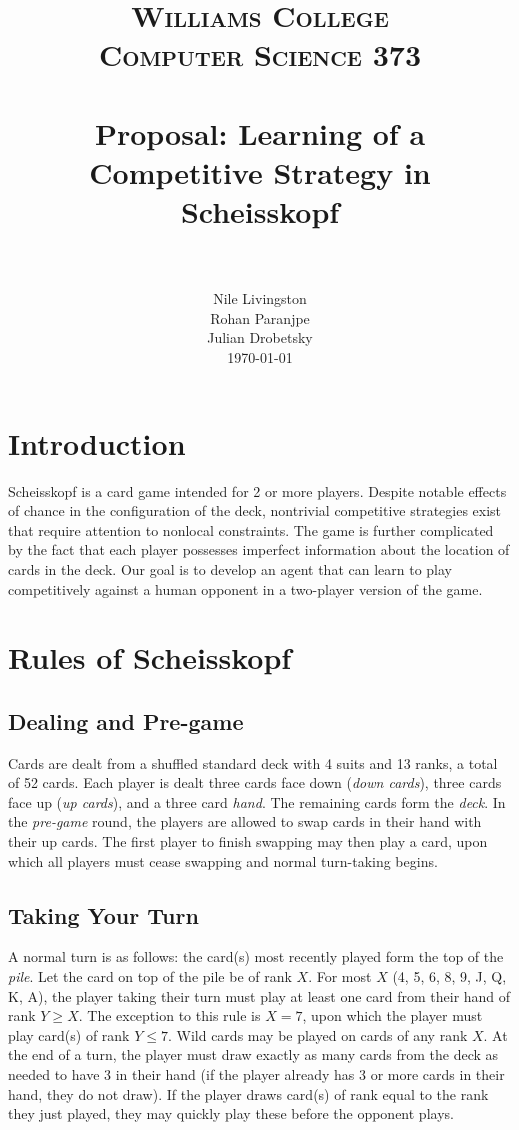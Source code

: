 \documentclass[paper=a4, fontsize=11pt]{scrartcl}
\title{
		\usefont{OT1}{bch}{b}{n}
		\normalfont \normalsize \textsc{Williams College \\ Computer Science 373} \\ [25pt]
		\horrule{0.5pt} \\[0.4cm]
		\huge Proposal: Learning of a Competitive Strategy in Scheisskopf \\
		\horrule{2pt} \\[0.5cm]
}
\author{
\normalfont 								
\normalsize Nile Livingston \\ 
\normalsize Rohan Paranjpe \\ 
\normalsize Julian Drobetsky \\
\normalsize
\today
}
\date{}
\numberwithin{equation}{section}		%
\numberwithin{figure}{section}			%
\numberwithin{table}{section}				%
\begin{document}
\maketitle
\section{Introduction}
Scheisskopf is a card game intended for 2 or more players. Despite notable effects of chance in the configuration of the deck, nontrivial competitive strategies exist that require attention to nonlocal constraints. The game is further complicated by the fact that each player possesses imperfect information about the location of cards in the deck. Our goal is to develop an agent that can learn to play competitively against a human opponent in a two-player version of the game.

\section{Rules of Scheisskopf}

\subsection{Dealing and Pre-game}
Cards are dealt from a shuffled standard deck with 4 suits and 13 ranks, a total of 52 cards. Each player is dealt three cards face down (\emph{down cards}), three cards face up (\emph{up cards}), and a three card \emph{hand}. The remaining cards form the \emph{deck}. In the \emph{pre-game} round, the players are allowed to swap cards in their hand with their up cards. The first player to finish swapping may then play a card, upon which all players must cease swapping and normal turn-taking begins. 
	
\subsection{Taking Your Turn}
A normal turn is as follows: the card(s) most recently played form the top of the \emph{pile}. Let the card on top of the pile be of rank $X$. For most $X$ (4, 5, 6, 8, 9, J, Q, K, A), the player taking their turn must play at least one card from their hand of rank $Y \geq X$. The exception to this rule is $X=7$, upon which the player must play card(s) of rank $Y \leq 7$. Wild cards may be played on cards of any rank $X$. At the end of a turn, the player must draw exactly as many cards from the deck as needed to have 3 in their hand (if the player already has 3 or more cards in their hand, they do not draw). If the player draws card(s) of rank equal to the rank they just played, they may quickly play these before the opponent plays.
\end{document}
